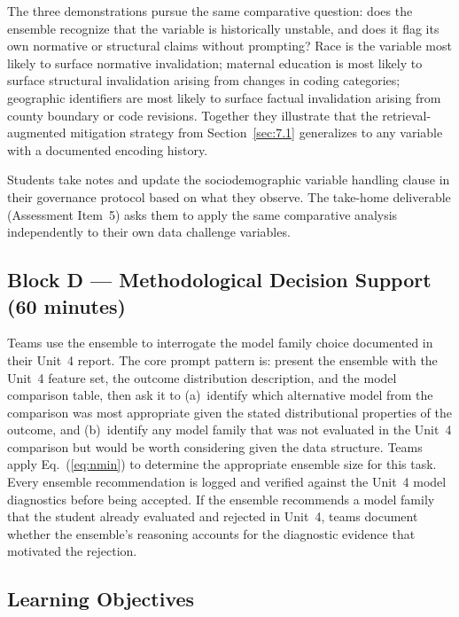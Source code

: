 The three demonstrations pursue the same comparative
question: does the ensemble recognize that the variable
is historically unstable, and does it flag its own
normative or structural claims without prompting? Race
is the variable most likely to surface normative
invalidation; maternal education is most likely to
surface structural invalidation arising from changes in
coding categories; geographic identifiers are most likely
to surface factual invalidation arising from county
boundary or code revisions. Together they illustrate
that the retrieval-augmented mitigation strategy from
Section~\ref{sec:7.1} generalizes to any variable
with a documented encoding history.

Students take notes and update the sociodemographic
variable handling clause in their governance protocol
based on what they observe. The take-home deliverable
(Assessment Item~5) asks them to apply the same
comparative analysis independently to their own
data challenge variables.

\subsection*{Block D --- Methodological Decision Support
(60 minutes)}

Teams use the ensemble to interrogate the model family choice
documented in their Unit~4 report. The core prompt pattern
is: present the ensemble with the Unit~4 feature set, the
outcome distribution description, and the model comparison
table, then ask it to (a)~identify which alternative model
from the comparison was most appropriate given the stated
distributional properties of the outcome, and (b)~identify
any model family that was not evaluated in the Unit~4
comparison but would be worth considering given the data
structure. Teams apply Eq.~(\ref{eq:nmin}) to determine
the appropriate ensemble size for this task. Every ensemble
recommendation is logged and verified against the Unit~4
model diagnostics before being accepted. If the ensemble
recommends a model family that the student already
evaluated and rejected in Unit~4, teams document whether
the ensemble's reasoning accounts for the diagnostic
evidence that motivated the rejection.

\subsection{Learning Objectives}

